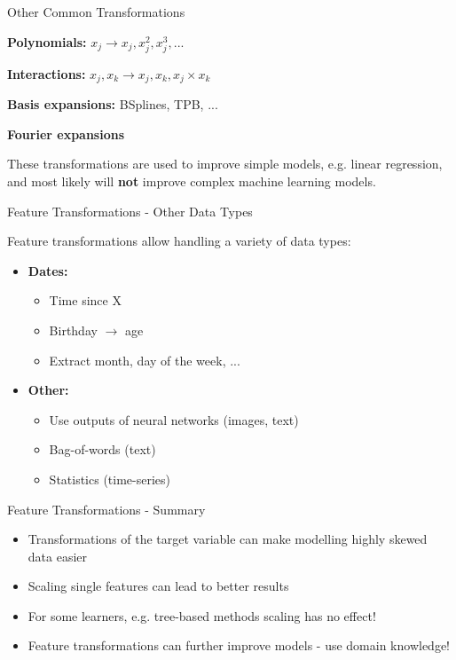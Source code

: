\begin{vbframe}{Other Common Transformations}

\textbf{Polynomials:} $x_j \longrightarrow x_j, x_j^2, x_j^3, ...$

\textbf{Interactions:} $x_j, x_k \longrightarrow x_j, x_k, x_j \times x_k$

\textbf{Basis expansions:} BSplines, TPB, ...

\textbf{Fourier expansions}

\lz

These transformations are used to improve simple models, e.g. linear regression, and most likely will \textbf{not} improve complex machine learning models.

\end{vbframe}

\begin{vbframe}{Feature Transformations - Other Data Types}

Feature transformations allow handling a variety of data types:

\lz

\begin{itemize}
\item \textbf{Dates:}
  \begin{itemize}
  \item Time since X
  \item Birthday $\rightarrow$ age
  \item Extract month, day of the week, ...
  \end{itemize}

\lz

\item \textbf{Other:}
  \begin{itemize}
  \item Use outputs of neural networks (images, text)
  \item Bag-of-words (text)
  \item Statistics (time-series)
  \end{itemize}
\end{itemize}

\end{vbframe}

\begin{vbframe}{Feature Transformations - Summary}

\begin{itemize}
\item Transformations of the target variable can make modelling highly skewed data easier

\item Scaling single features can lead to better results

\item For some learners, e.g. tree-based methods scaling has no effect!

\item Feature transformations can further improve models - use domain knowledge!
\end{itemize}

\end{vbframe}

\endlecture

